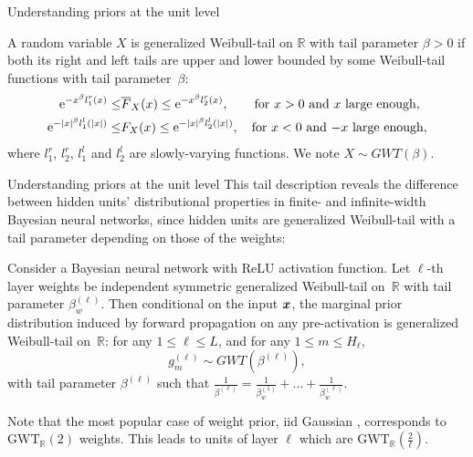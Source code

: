 \documentclass[9pt]{beamer}
\begin{document}
\begin{frame}{Understanding priors at the unit level}
	\begin{definition}
\label{def:gen_weibull-tail_r}
A random variable $X$ is generalized Weibull-tail on $\mathbb{R}$ with tail parameter $\beta > 0$ if both its right and left tails are upper and lower bounded by some Weibull-tail functions with tail parameter~$\beta$:
\begin{align*}
    \mathrm{e}^{-x^{\beta} l_1^r(x)} \le & \overline{F}_X(x) \le \mathrm{e}^{-x^{\beta} l_2^r(x)}, \quad \ \ \ \text{for }x > 0 \text{ and $x$ large enough}, \\
    \mathrm{e}^{-|x|^{\beta} l_1^l(|x|)} \le & F_X(x) \le \mathrm{e}^{-|x|^{\beta} l_2^l(|x|)}, \quad \text{for } x < 0 \text{ and $-x$ large enough},
\end{align*}
where $l_1^r$, $l_2^r$, $l_1^l$ and $l_2^l$ are slowly-varying functions. 
We note $X \sim GWT(\beta)$. 
\end{definition}
\end{frame}

\begin{frame}{Understanding priors at the unit level}
This tail description reveals the difference between hidden units' distributional properties in finite- and infinite-width Bayesian neural networks, since 
hidden units are generalized Weibull-tail with a tail parameter depending on those of the weights:
\begin{theorem}
\label{theorem:hidden_units_are_gwt}
Consider a Bayesian neural network  with ReLU activation function. Let $\ell$-th layer weights be independent symmetric generalized Weibull-tail on~$\mathbb{R}$ with tail parameter $\beta^{(\ell)}_w$. 
Then conditional on the input $\boldsymbol{x}$, the marginal prior distribution induced by forward propagation on any pre-activation is generalized Weibull-tail on~$\mathbb{R}$: for any $1\leq \ell\leq L$, and for any $1\leq m\leq H_\ell$,
$$g_m^{(\ell)}\sim GWT(\beta^{(\ell)}),$$
with tail parameter $\beta^{(\ell)}$ such that $\frac{1}{\beta^{(\ell)}} = \frac{1}{\beta^{(1)}_w} + \dots + \frac{1}{\beta^{(\ell)}_w}$.
\end{theorem}
Note that the most popular case of weight prior, iid Gaussian \citep{neal1996bayesian}, corresponds to $\text{GWT}_{\mathbb{R}}(2)$ weights. This leads to units of layer $\ell$ which are $\text{GWT}_{\mathbb{R}}(\frac{2}{\ell})$. 
\end{frame}
\end{document}
